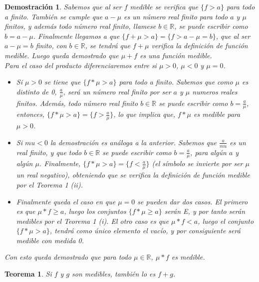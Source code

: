 \documentclass{article}
\newtheorem{theorem}{Teorema}
\newtheorem{demostration}{Demostración}
\begin{document}
\begin{demostration}
Sabemos que al ser $f$ medible se verifica que $\{f > a\}$ para todo a finito. También se cumple que $a - \mu$ es un número real finito para todo $a$ y $\mu$ finitos, y además todo número real finito, llamese $b \in \mathbb{R}$, se puede escribir como $b= a - \mu$. Finalmente llegamos a que $\{f + \mu > a\} = \{f > a - \mu = b \}$, que al ser $a - \mu = b$ finito, con $b \in \mathbb{R}$, se tendrá que $f + \mu$ verifica la definición de función medible. Luego queda demostrado que $\mu + f$ es una función medible.\\

Para el caso del producto diferenciaremos entre si $\mu > 0$, $\mu < 0$ y $\mu = 0$.

\begin{itemize}
\item Si $\mu > 0$ se tiene que $\{f*\mu > a\}$ para todo a finito. Sabemos que como $\mu$ es distinto de 0, $\frac{a}{\mu}$, será un número real finito por ser $a$ y $\mu$ numeros reales finitos. Además, todo número real finito $b \in \mathbb{R}$ se puede escribir como $b = \frac{a}{\mu}$, entonces, $\{f*\mu > a\} = \{f > \frac{a}{\mu}\}$, lo que implica que, $f*\mu$ es medible para $\mu > 0$.

\item Si $mu < 0$ la demostración es análoga a la anterior. Sabemos que $\frac{a}{mu}$ es un real finito, y que todo $b \in \mathbb{R}$ se puede escribir como $ b = \frac{a}{\mu}$, para algún $a$ y algún $\mu$. Finalmente, $\{f*\mu > a\}=\{f < \frac{a}{\mu} \}$ (el símbolo se invierte por ser $\mu$ un real negativo), obteniendo que se verifica la definición de función medible por el Teorema 1 (ii). 

\item Finalmente queda el caso en que $\mu = 0$ se pueden dar dos casos. El primero es que $\mu*f \geq a$, luego los conjuntos $\{f*\mu \geq a\}$ serán E, y por tanto serán medibles por el Teorema 1 (i). El otro caso es que $\mu*f < a$, luego el conjunto $\{f*\mu > a\}$, tendrá como único elemento el vacío, y por consiguiente será medible con medida 0.
\end{itemize}

Con esto queda demostrado que para todo $\mu \in \mathbb{R}$, $\mu*f$ es medible.
\end{demostration}

\begin{theorem}
Si $f$ y $g$ son medibles, también lo es $f + g$.
\end{theorem}
\end{document}
